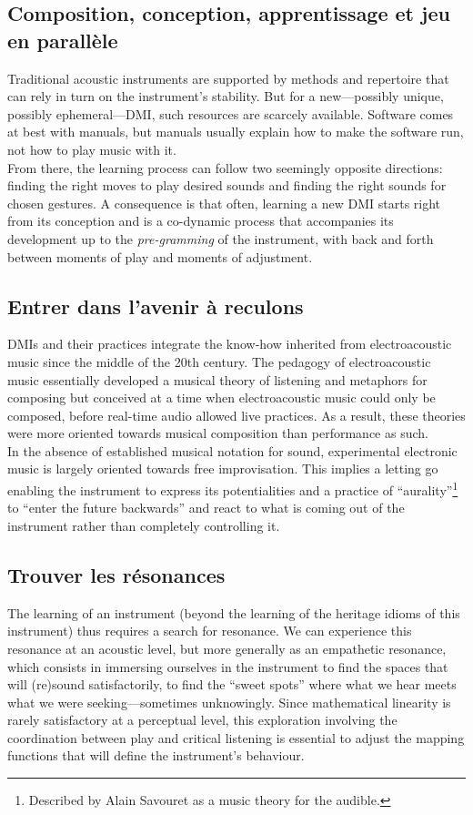 \subsection{Composition, conception, apprentissage et jeu en parallèle}
\indent Traditional acoustic instruments are supported by methods and repertoire that can rely in turn on the instrument's stability. But for a new—possibly unique, possibly ephemeral—DMI, such resources are scarcely available. Software comes at best with manuals, but manuals usually explain how to make the software run, not how to play music with it.\\
\indent From there, the learning process can follow two seemingly opposite directions: finding the right moves to play desired sounds and finding the right sounds for chosen gestures. A consequence is that often, learning a new DMI starts right from its conception and is a co-dynamic process that accompanies its development up to the \textit{pre-gramming} of the instrument, with back and forth between moments of play and moments of adjustment.

\subsection{Entrer dans l'avenir à reculons}
DMIs and their practices integrate the know-how inherited from electroacoustic music since the middle of the 20th century. The pedagogy of electroacoustic music essentially developed a musical theory of listening \cite{schaeffer_traite_1966} and metaphors for composing \cite{bayle_musique_1993} but conceived at a time when electroacoustic music could only be composed, before real-time audio allowed live practices. As a result, these theories were more oriented towards musical composition than performance as such.\\
\indent In the absence of established musical notation for sound, experimental electronic music is largely oriented towards free improvisation. This implies a letting go enabling the instrument to express its potentialities and a practice of “aurality”\footnote{Described by Alain Savouret as a music theory for the audible.} to “enter the future backwards” \cite{savouret_introduction_2010} and react to what is coming out of the instrument rather than completely controlling it.
	
	
\subsection{Trouver les résonances}
	The learning of an instrument (beyond the learning of the heritage idioms of this instrument) thus requires a search for resonance. We can experience this resonance at an acoustic level, but more generally as an empathetic resonance, which consists in immersing ourselves in the instrument to find the spaces that will (re)sound satisfactorily, to find the “sweet spots” where what we hear meets what we were seeking—sometimes unknowingly. Since mathematical linearity is rarely satisfactory at a perceptual level, this exploration involving the coordination between play and critical listening is essential to adjust the mapping functions that will define the instrument's behaviour.
	
